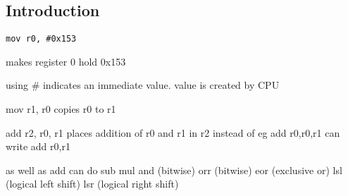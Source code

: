 
\subsection{Introduction}

\begin{verbatim}
mov r0, #0x153
\end{verbatim}

makes register 0 hold 0x153

using \# indicates an immediate value. value is created by CPU

mov r1, r0
copies r0 to r1


add r2, r0, r1
places addition of r0 and r1 in r2
instead of eg
add r0,r0,r1
can write
add r0,r1

as well as add can do
sub
mul
and (bitwise)
orr (bitwise)
eor (exclusive or)
lsl (logical left shift)
lsr (logical right shift)


